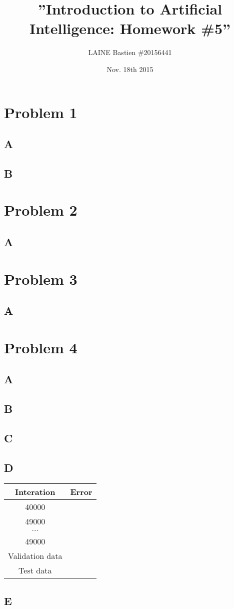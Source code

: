 \documentclass{article}
\begin{document}
\title{\textbf{''Introduction to Artificial Intelligence: Homework \#5''}}
\author{LAINE Bastien \#20156441}
\date{Nov. 18th 2015}
\maketitle
\tableofcontents

\newpage
    \section{Problem 1}
        \subsection{A}
        \subsection{B}
    \section{Problem 2}
        \subsection{A}
    \section{Problem 3}
        \subsection{A}
    \section{Problem 4}
        \subsection{A}
        \subsection{B}
        \subsection{C}
        \subsection{D}
            \begin{tabular}{|c|c|}
                \hline
                Interation & Error \\
                \hline
                40000 & \\
                \hline
                49000 & \\
                \hline
                $\cdots$ & \\
                \hline
                49000 & \\
                \hline
                Validation data & \\
                \hline
                Test data & \\
                \hline
            \end{tabular}
        \subsection{E}
\end{document}

